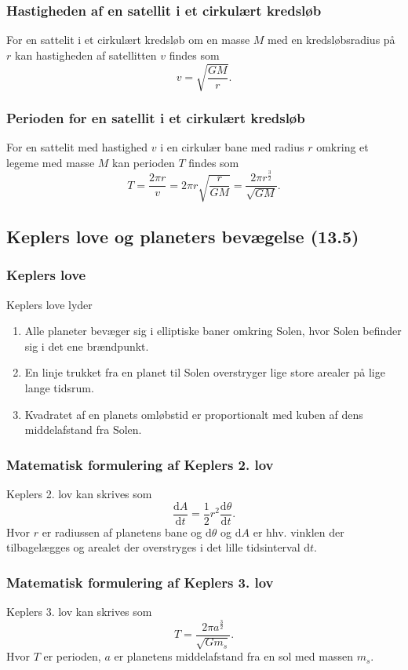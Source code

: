\subsubsection{Hastigheden af en satellit i et cirkulært kredsløb} \label{afs:hassat}
For en sattelit i et cirkulært kredsløb om en masse $M$ med en kredsløbsradius på $r$ kan hastigheden af satellitten $v$ findes som
\[ 
v = \sqrt{\frac{GM}{r}}
.\]

\subsubsection{Perioden for en satellit i et cirkulært kredsløb} \label{afs:persat}
For en sattelit med hastighed $v$ i en cirkulær bane med radius $r$ omkring et legeme med masse $M$ kan perioden $T$ findes som
\[ 
T = \frac{2\pi r}{v} = 2\pi r \sqrt{\frac{r}{GM}} = \frac{2\pi r^{\frac{3}{2}}}{\sqrt{GM}}
.\]


\subsection{Keplers love og planeters bevægelse (13.5)}

\subsubsection{Keplers love}
Keplers love lyder
\begin{enumerate}
  \item Alle planeter bevæger sig i elliptiske baner omkring Solen, hvor Solen befinder sig i det ene brændpunkt.
  \item En linje trukket fra en planet til Solen overstryger lige store arealer på lige lange tidsrum.
  \item Kvadratet af en planets omløbstid er proportionalt med kuben af dens middelafstand fra Solen.
\end{enumerate}


\subsubsection{Matematisk formulering af Keplers 2. lov}
Keplers 2. lov kan skrives som
\[ 
\frac{\mathrm{d}A}{\mathrm{d}t} = \frac{1}{2}r^2 \frac{\mathrm{d}\theta}{\mathrm{d}t} 
.\]
Hvor $r$ er radiussen af planetens bane og $\mathrm{d}\theta$ og $\mathrm{d}A$ er hhv. vinklen der tilbagelægges og arealet der overstryges i det lille tidsinterval $\mathrm{d}t$.

\subsubsection{Matematisk formulering af Keplers 3. lov}
Keplers 3. lov kan skrives som
\[ 
T = \frac{2\pi a^{\frac{3}{2}}}{\sqrt{Gm_s}}
.\]
Hvor $T$ er perioden, $a$ er planetens middelafstand fra en sol med massen $m_s$. 




